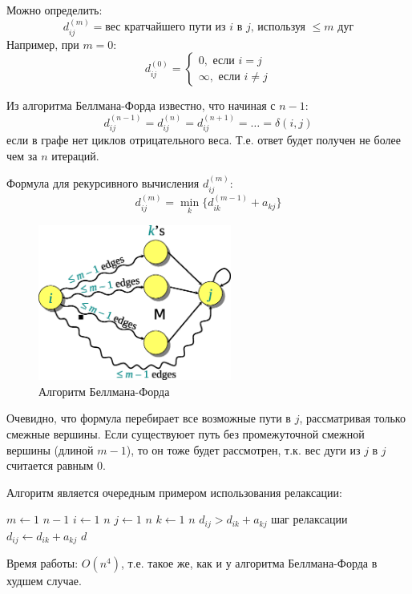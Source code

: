 \documentclass[11pt]{article}
\begin{document}
Можно определить:
\begin{equation*}
  d_{i j}^{(m)} = \text{вес кратчайшего пути из } i \text{ в } j \text{, используя } \leqslant m \text{ дуг}
\end{equation*}
Например, при $m = 0$:
\begin{equation*}
  d_{i j}^{(0)} = \begin{cases}
    0, \text{ если } i = j \\
    \infty, \text{ если } i \neq j
  \end{cases}
\end{equation*}

Из алгоритма Беллмана-Форда известно, что начиная с $n-1$:
\begin{equation*}
  d_{i j}^{(n-1)} = d_{i j}^{(n)} = d_{i j}^{(n+1)} = \ldots = \delta(i, j)
\end{equation*}
если в графе нет циклов отрицательного веса. Т.е. ответ будет получен не более чем за $n$ итераций.

Формула для рекурсивного вычисления $d_{i j}^{(m)}$:
\begin{equation*}
  d_{i j}^{(m)} = \min_k\{d_{i k}^{(m-1)} + a_{k j}\}
\end{equation*}
\begin{figure}[ht!]
  \centering
  \includegraphics[width=2.5in]{lecture19/bford.eps}
  \caption{Алгоритм Беллмана-Форда}
\end{figure}
Очевидно, что формула перебирает все возможные пути в $j$, рассматривая только смежные вершины. Если существуюет путь без промежуточной смежной вершины (длиной $m-1$), то он тоже будет рассмотрен, т.к. вес дуги из $j$ в $j$ считается равным $0$.

Алгоритм является очередным примером использования релаксации:
\begin{codebox}
\li \For $m \gets 1$ \To $n-1$
\li \Do \For $i \gets 1$ \To $n$
\li        \Do \For $j \gets 1$ \To $n$
\li            \Do \For $k \gets 1$ \To $n$
\li                \Do \If $d_{i j} > d_{i k} + a_{k j}$ \Comment шаг релаксации
\li                    \Then $d_{i j} \gets d_{i k} + a_{k j}$
                   \End
               \End
            \End
        \End
    \End
\li \Return $d$
\end{codebox}
Время работы: $O(n^4)$, т.е. такое же, как и у алгоритма Беллмана-Форда в худшем случае.
\end{document}
